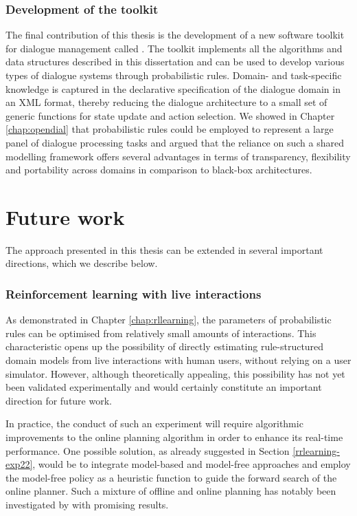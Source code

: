 

\subsubsection*{Development of the \opendial{} toolkit}

The final contribution of this thesis is the development of a new software toolkit for dialogue management called \opendial{}. The toolkit implements all the algorithms and data structures described in this dissertation and can be used to develop various types of dialogue systems through probabilistic rules. Domain- and task-specific knowledge is captured in the declarative specification of the dialogue domain in an XML format, thereby reducing the dialogue architecture to a small set of generic functions for state update and action selection.  We showed in Chapter \ref{chap:opendial} that probabilistic rules could be employed to represent a large panel of dialogue processing tasks and argued that the reliance on such a shared modelling framework offers several advantages in terms of transparency, flexibility and portability across domains in comparison to black-box architectures.

\section{Future work}

The approach presented in this thesis can be extended in several important directions, which we describe below. 

\subsubsection*{Reinforcement learning with live interactions}

As demonstrated in Chapter \ref{chap:rllearning}, the parameters of probabilistic rules can be optimised from relatively small amounts of interactions.  This characteristic opens up the possibility of directly estimating rule-structured domain models from live interactions with human users, without relying on a user simulator.  However, although theoretically appealing, this possibility has not yet been validated experimentally and would certainly constitute an important direction for future work.

In practice, the conduct of such an experiment will require algorithmic improvements to the online planning algorithm in order to enhance its real-time performance. One possible solution, as already suggested in Section \ref{rrlearning-exp22}, would be to integrate model-based and model-free approaches and employ the model-free policy as a heuristic function to guide the forward search of the online planner.  Such a mixture of offline and online planning has notably been investigated by \cite{RossC07} with promising results.


